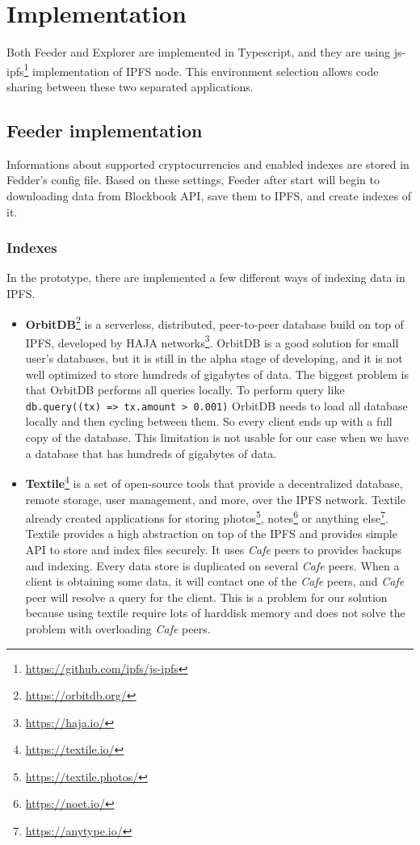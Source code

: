 \chapter{Implementation}

Both Feeder and Explorer are implemented in Typescript, and they are using js-ipfs\footnote{\url{https://github.com/ipfs/js-ipfs}} implementation of IPFS node. This environment selection allows code sharing between these two separated applications.

\section{Feeder implementation}
Informations about supported cryptocurrencies and enabled indexes are stored in Fedder's config file. Based on these settings, Feeder after start will begin to downloading data from Blockbook API, save them to IPFS, and create indexes of it.

\subsection{Indexes}
In the prototype, there are implemented a few different ways of indexing data in IPFS.
\begin{itemize}
    \item \textbf{OrbitDB}\footnote{\url{https://orbitdb.org/}} is a serverless, distributed, peer-to-peer database build on top of IPFS, developed by HAJA networks\footnote{\url{https://haja.io/}}. OrbitDB is a good solution for small user's databases, but it is still in the alpha stage of developing, and it is not well optimized to store hundreds of gigabytes of data. The biggest problem is that OrbitDB performs all queries locally. To perform query like \texttt{db.query((tx) => tx.amount > 0.001)} OrbitDB needs to load all database locally and then cycling between them. So every client ends up with a full copy of the database. This limitation is not usable for our case when we have a database that has hundreds of gigabytes of data.
    \cite{OrbitDBManual}
    \item \textbf{Textile}\footnote{\url{https://textile.io/}} is a set of open-source tools that provide a decentralized database, remote storage, user management, and more, over the IPFS network. Textile already created applications for storing photos\footnote{\url{https://textile.photos/}}, notes\footnote{\url{https://noet.io/}} or anything else\footnote{\url{https://anytype.io/}}. Textile provides a high abstraction on top of the IPFS and provides simple API to store and index files securely. It uses \textit{Cafe} peers to provides backups and indexing. Every data store is duplicated on several \textit{Cafe} peers. When a client is obtaining some data, it will contact one of the \textit{Cafe} peers, and \textit{Cafe} peer will resolve a query for the client. This is a problem for our solution because using textile require lots of harddisk memory and does not solve the problem with overloading \textit{Cafe} peers.
    \cite{TextileWhitePaper}
\end{itemize}


